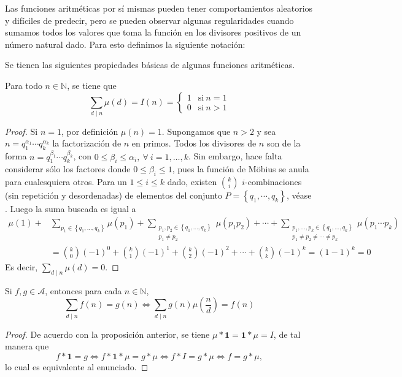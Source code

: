 Las funciones aritméticas por sí mismas pueden tener comportamientos aleatorios y difíciles de predecir, pero se pueden observar algunas regularidades cuando sumamos todos los valores que toma la función en los divisores positivos de un número natural dado. Para esto definimos la siguiente notación:

Se tienen las siguientes propiedades básicas de algunas funciones aritméticas.

\begin{proposition}
Para todo $n\in\mathbb{N}$, se tiene que 
\begin{equation*}
	\sum_{d \mid n} \mu(d) = I(n) =
		\begin{cases}
			1 & \text{si} \: n=1 \\ %
			0 & \text{si} \: n>1
		\end{cases}
\end{equation*}
\end{proposition}
\begin{proof}
Si $n=1$, por definición $\mu(n)=1$. Supongamos que $n>2$ y sea $n=q_1^{\alpha_1}\cdots q_k^{\alpha_k}$ la factorización de $n$ en primos. Todos los divisores de $n$ son de la forma $n=q_1^{\beta_1}\cdots q_k^{\beta_k}$, con $0\leq \beta_i\leq \alpha_i,\:\forall \: i=1,\ldots,k$. Sin embargo, hace falta considerar sólo los factores donde $0\leq \beta_i\leq 1$, pues la función de Möbius se anula para cualesquiera otros. Para un $1\leq i\leq k$ dado, existen $\binom{k}{i}$ $i$-combinaciones (sin repetición y desordenadas) de elementos del conjunto $P=\left\{q_1,\cdots,q_k\right\}$, véase \cite{Br1-1999}. Luego la suma buscada es igual a
\begin{align*}
    \mu(1)+&\sum_{p_1\in\left\{q_1,\ldots,q_k\right\}} \mu(p_1) + \sum_{\substack{p_1,p_2\in \left\{q_1,\ldots,q_k\right\} \\ p_1\neq p_2}} \mu(p_1 p_2)+\cdots+\sum_{\substack{p_1,\ldots,p_k\in \left\{q_1,\ldots,q_k\right\} \\ p_1\neq p_2 \neq \cdots \neq p_k}} \mu(p_1\cdots p_k) \\
						   &= \binom{k}{0}(-1)^0+\binom{k}{1}(-1)^1+\binom{k}{2}(-1)^2+\cdots+\binom{k}{k}(-1)^k =  (1-1)^k=0
\end{align*}
Es decir, $\sum_{d \mid n} \mu(d)=0$.
\end{proof}

\begin{corollary}\label{cor:mob1}
Si $f,g \in \mathcal{A}$, entonces para cada $n \in \mathbb{N}$,
\begin{equation*}
    \sum_{d \mid n} f(n) = g(n) \iff \sum_{d \mid n} g(n)\mu \left( \frac{n}{d} \right) = f(n)
\end{equation*}
\end{corollary}
\begin{proof}
De acuerdo con la proposición anterior, se tiene $\mu*\mathbf{1}=\mathbf{1}*\mu=I$, de tal manera que
\begin{equation*}
    f*\mathbf{1} =  g \iff f*\mathbf{1}*\mu = g * \mu \iff f*I = g * \mu \iff f = g * \mu,
\end{equation*}
lo cual es equivalente al enunciado.
\end{proof}


